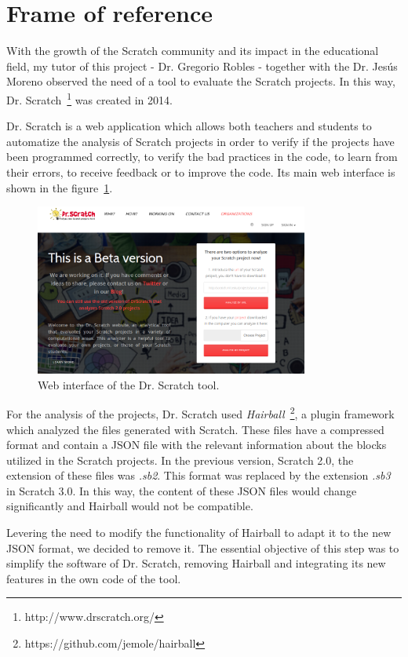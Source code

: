 \section{Frame of reference}
\label{sec:reference}

With the growth of the Scratch community and its impact in the educational field, my tutor of this project - Dr. Gregorio Robles - together with the Dr. Jesús Moreno observed the need of a tool to evaluate the Scratch projects. In this way, Dr. Scratch~\footnote{http://www.drscratch.org/} was created in 2014.

Dr. Scratch is a web application which allows both teachers and students to automatize the analysis of Scratch projects in order to verify if the projects have been programmed correctly, to verify the bad practices in the code, to learn from their errors, to receive feedback or to improve the code. Its main web interface is shown in the figure~\ref{fig:dr_scratch}.

\begin{figure}
  \centering
  \includegraphics[width=9cm, keepaspectratio]{img/dr_scratch.png}
  \caption{Web interface of the Dr. Scratch tool.}
  \label{fig:dr_scratch}
\end{figure}

For the analysis of the projects, Dr. Scratch used \textit{Hairball}~\footnote{https://github.com/jemole/hairball}, a plugin framework which analyzed the files generated with Scratch. These files have a compressed format and contain a JSON file with the relevant information about the blocks utilized in the Scratch projects. In the previous version, Scratch 2.0, the extension of these files was \textit{.sb2}. This format was replaced by the extension \textit{.sb3} in Scratch 3.0. In this way, the content of these JSON files would change significantly and Hairball would not be compatible.

Levering the need to modify the functionality of Hairball to adapt it to the new JSON format, we decided to remove it. The essential objective of this step was to simplify the software of Dr. Scratch, removing Hairball and integrating its new features in the own code of the tool. 

